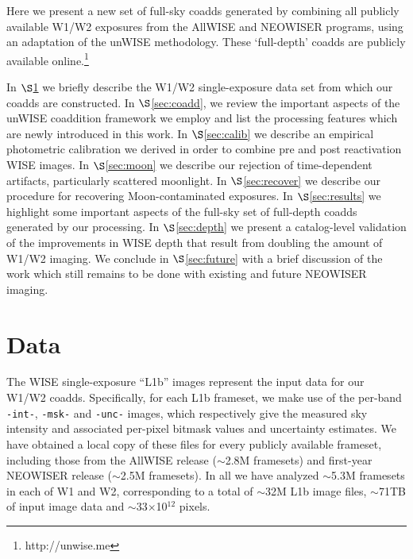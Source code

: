 \documentclass{emulateapj}
\begin{document}

Here we present a new set of full-sky coadds generated by
combining all publicly available W1/W2 exposures from the AllWISE and NEOWISER
programs, using an adaptation of the \cite{lang14} unWISE methodology. These 
`full-depth' coadds are publicly available online.\footnote{http://unwise.me}

In $\S$\ref{sec:data} we briefly describe the W1/W2 single-exposure data set 
from which our coadds are constructed. In $\S$\ref{sec:coadd}, we review the 
important aspects of the unWISE coaddition framework we employ and list the 
processing features which are newly introduced in this work. In 
$\S$\ref{sec:calib} we describe an empirical photometric calibration we
derived in order to combine pre and post reactivation WISE images. In 
$\S$\ref{sec:moon} we describe our rejection of time-dependent artifacts, 
particularly scattered moonlight. In $\S$\ref{sec:recover} we describe
our procedure for recovering Moon-contaminated exposures. In 
$\S$\ref{sec:results} we highlight some important aspects of the full-sky set 
of full-depth coadds generated by our processing. In $\S$\ref{sec:depth} we 
present a catalog-level validation of the improvements in WISE depth
that result from doubling the amount of W1/W2 imaging. We conclude in 
$\S$\ref{sec:future} with a brief discussion of the work which still remains to
be done with existing and future NEOWISER imaging.

\section{Data}
\label{sec:data}

The WISE single-exposure ``L1b'' images represent
the input data for our W1/W2 coadds. Specifically, for each L1b frameset, we 
make use of the per-band \verb|-int-|, \verb|-msk-| and \verb|-unc-| images, 
which respectively give the measured sky intensity and associated per-pixel 
bitmask values and uncertainty estimates. We have obtained a local copy of 
these files for every publicly available frameset, including those 
from the AllWISE release ($\sim$2.8M framesets) and first-year NEOWISER release
($\sim$2.5M framesets). In all we have analyzed $\sim$5.3M framesets in each of
W1 and W2, corresponding to a total of $\sim$32M L1b image files, $\sim$71TB of 
input image data and $\sim$33$\times$10$^{12}$ pixels.
\end{document}
